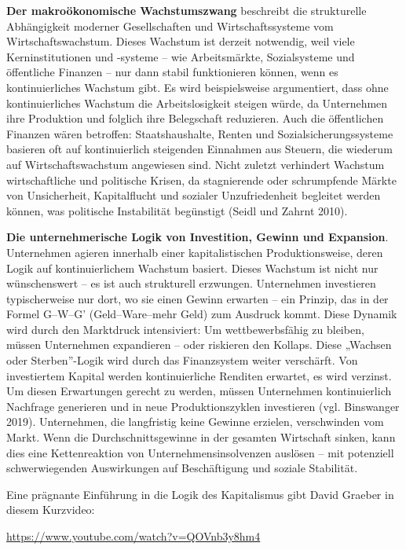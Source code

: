 \documentclass[
  nswissgerman,
  a4paper,
  openany]{book}
\begin{document}
\textbf{Der makroökonomische Wachstumszwang} beschreibt die strukturelle
Abhängigkeit moderner Gesellschaften und Wirtschaftssysteme vom
Wirtschaftswachstum. Dieses Wachstum ist derzeit notwendig, weil viele
Kerninstitutionen und -systeme -- wie Arbeitsmärkte, Sozialsysteme und
öffentliche Finanzen -- nur dann stabil funktionieren können, wenn es
kontinuierliches Wachstum gibt. Es wird beispielsweise argumentiert,
dass ohne kontinuierliches Wachstum die Arbeitslosigkeit steigen würde,
da Unternehmen ihre Produktion und folglich ihre Belegschaft reduzieren.
Auch die öffentlichen Finanzen wären betroffen: Staatshaushalte, Renten
und Sozialsicherungssysteme basieren oft auf kontinuierlich steigenden
Einnahmen aus Steuern, die wiederum auf Wirtschaftswachstum angewiesen
sind. Nicht zuletzt verhindert Wachstum wirtschaftliche und politische
Krisen, da stagnierende oder schrumpfende Märkte von Unsicherheit,
Kapitalflucht und sozialer Unzufriedenheit begleitet werden können, was
politische Instabilität begünstigt (Seidl und Zahrnt 2010).

\textbf{Die unternehmerische Logik von Investition, Gewinn und
Expansion}. Unternehmen agieren innerhalb einer kapitalistischen
Produktionsweise, deren Logik auf kontinuierlichem Wachstum basiert.
Dieses Wachstum ist nicht nur wünschenswert -- es ist auch strukturell
erzwungen. Unternehmen investieren typischerweise nur dort, wo sie einen
Gewinn erwarten -- ein Prinzip, das in der Formel G--W--G'
(Geld--Ware--mehr Geld) zum Ausdruck kommt. Diese Dynamik wird durch den
Marktdruck intensiviert: Um wettbewerbsfähig zu bleiben, müssen
Unternehmen expandieren -- oder riskieren den Kollaps. Diese „Wachsen
oder Sterben''-Logik wird durch das Finanzsystem weiter verschärft. Von
investiertem Kapital werden kontinuierliche Renditen erwartet, es wird
verzinst. Um diesen Erwartungen gerecht zu werden, müssen Unternehmen
kontinuierlich Nachfrage generieren und in neue Produktionszyklen
investieren (vgl. Binswanger 2019). Unternehmen, die langfristig keine
Gewinne erzielen, verschwinden vom Markt. Wenn die Durchschnittsgewinne
in der gesamten Wirtschaft sinken, kann dies eine Kettenreaktion von
Unternehmensinsolvenzen auslösen -- mit potenziell schwerwiegenden
Auswirkungen auf Beschäftigung und soziale Stabilität.

Eine prägnante Einführung in die Logik des Kapitalismus gibt David
Graeber in diesem Kurzvideo:

\url{https://www.youtube.com/watch?v=QOVnb3y8hm4}
\end{document}

